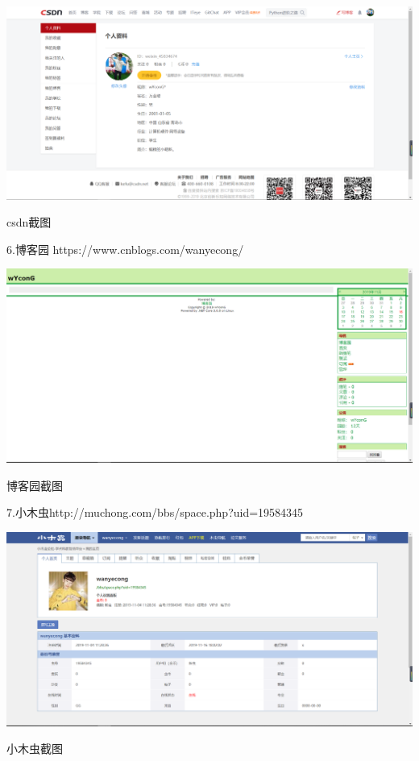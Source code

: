 \documentclass{article}
\begin{document}
\makeatother
\includegraphics[scale=0.3]{csdn}
\caption{csdn截图}
\label{fig:csdn}
6.博客园
https://www.cnblogs.com/wanyecong/
\makeatletter

\def\@captype{figure}

\makeatother
\includegraphics[scale=0.3]{bokeyuan}
\caption{博客园截图}
\label{fig:bokeyuan}

7.小木虫http://muchong.com/bbs/space.php?uid=19584345
\makeatletter

\def\@captype{figure}

\makeatother
\includegraphics[scale=0.3]{xiaomuchong}
\caption{小木虫截图}
\label{fig:xiaomuchong}





\end{document}
